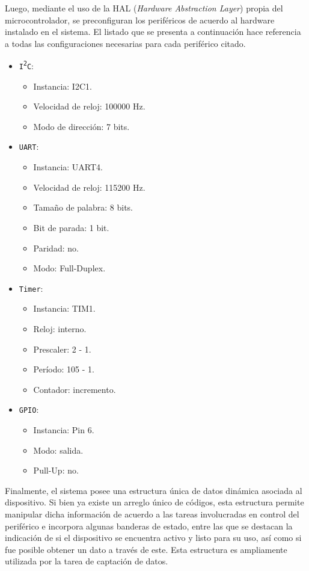 Luego, mediante el uso de la HAL ({\it{Hardware Abstraction Layer}}) propia del microcontrolador, se preconfiguran los periféricos de acuerdo al hardware instalado en el sistema. El listado que se presenta a continuación hace referencia a todas las configuraciones necesarias para cada periférico citado.
\begin{itemize}
    \item {\texttt{I\textsuperscript{2}C}}:
        \begin{itemize}
            \item Instancia: I2C1.
            \item Velocidad de reloj: 100000 Hz.
            \item Modo de dirección: 7 bits.
        \end{itemize}
    \item {\texttt{UART}}:
        \begin{itemize}
            \item Instancia: UART4.
            \item Velocidad de reloj: 115200 Hz.
            \item Tamaño de palabra: 8 bits.
            \item Bit de parada: 1 bit.
            \item Paridad: no.
            \item Modo: Full-Duplex.
        \end{itemize}
    \item {\texttt{Timer}}:
        \begin{itemize}
            \item Instancia: TIM1.
            \item Reloj: interno.
            \item Prescaler: 2 - 1.
            \item Período: 105 - 1.
            \item Contador: incremento.
        \end{itemize}
    \item {\texttt{GPIO}}:
        \begin{itemize}
            \item Instancia: Pin 6.
            \item Modo: salida.
            \item Pull-Up: no.
        \end{itemize}
\end{itemize}

Finalmente, el sistema posee una estructura única de datos dinámica asociada al dispositivo. Si bien ya existe un arreglo único de códigos, esta estructura permite manipular dicha información de acuerdo a las tareas involucradas en control del periférico e incorpora algunas banderas de estado, entre las que se destacan la indicación de si el dispositivo se encuentra activo y listo para su uso, así como si fue posible obtener un dato a través de este. Esta estructura es ampliamente utilizada por la tarea de captación de datos.

